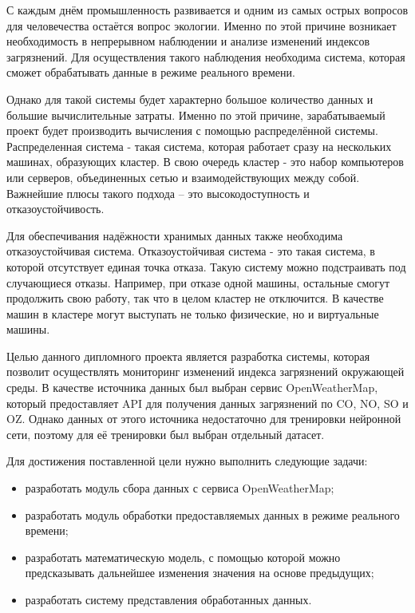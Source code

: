 \label{sec:intro}

С каждым днём промышленность развивается и одним из самых острых вопросов для человечества остаётся вопрос экологии.
Именно по этой причине возникает необходимость в непрерывном наблюдении и анализе изменений индексов загрязнений.
Для осуществления такого наблюдения необходима система, которая сможет обрабатывать данные в режиме реального времени.

Однако для такой системы будет характерно большое количество данных и большие вычислительные затраты.
Именно по этой причине, зарабатываемый проект будет производить вычисления с помощью распределённой системы.
Распределенная система - такая система, которая работает сразу на нескольких машинах, образующих кластер.
В свою очередь кластер - это набор компьютеров или серверов, объединенных сетью и взаимодействующих между собой.
Важнейшие плюсы такого подхода – это высокодоступность и отказоустойчивость.

Для обеспечивания надёжности хранимых данных также необходима отказоустойчивая система. 
Отказоустойчивая система - это такая система, в которой отсутствует единая точка отказа.
Такую систему можно подстраивать под случающиеся отказы.
Например, при отказе одной машины, остальные смогут продолжить свою работу, так что в целом кластер не отключится.
В качестве машин в кластере могут выступать не только физические, но и виртуальные машины.

Целью данного дипломного проекта является разработка системы, которая позволит осуществлять мониторинг изменений индекса загрязнений окружающей среды.
В качестве источника данных был выбран сервис OpenWeatherMap, который предоставляет API для получения данных загрязнений по CO, NO, SO и OZ.
Однако данных от этого источника недостаточно для тренировки нейронной сети, поэтому для её тренировки был выбран отдельный датасет.


Для достижения поставленной цели нужно выполнить следующие задачи:
\begin{itemize}
    \item разработать модуль сбора данных с сервиса OpenWeatherMap;
    \item разработать модуль обработки предоставляемых данных в режиме реального времени;
    \item разработать математическую модель, с помощью которой можно предсказывать дальнейшее изменения значения на основе предыдущих;
    \item разработать систему представления обработанных данных.
\end{itemize}

